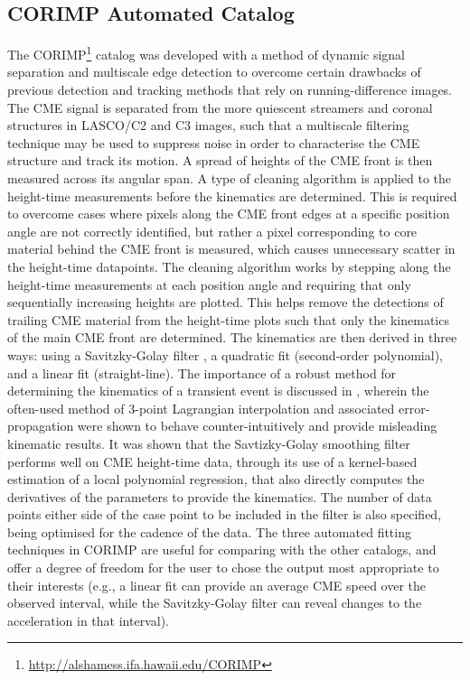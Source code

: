 \documentclass[referee,a4paper,12pt,traditabstract]{swsc}
\begin{document}
\begin{linenumbers}
\subsection{CORIMP Automated Catalog}
\label{sect_corimp}

The CORIMP\footnote{\href{http://alshamess.ifa.hawaii.edu/CORIMP/}{http://alshamess.ifa.hawaii.edu/CORIMP}} catalog was developed with a method of dynamic signal separation and multiscale edge detection to overcome certain drawbacks of previous detection and tracking methods that rely on running-difference images. The CME signal is separated from the more quiescent streamers and coronal structures in LASCO/C2 and C3 images, such that a multiscale filtering technique may be used to suppress noise in order to characterise the CME structure and track its motion. A spread of heights of the CME front is then measured across its angular span. A type of cleaning algorithm is applied to the height-time measurements before the kinematics are determined. This is required to overcome cases where pixels along the CME front edges at a specific position angle are not correctly identified, but rather a pixel corresponding to core material behind the CME front is measured, which causes unnecessary scatter in the height-time datapoints. The cleaning algorithm works by stepping along the height-time measurements at each position angle and requiring that only sequentially increasing heights are plotted. This helps remove the detections of trailing CME material from the height-time plots such that only the kinematics of the main CME front are determined. The kinematics are then derived in three ways: using a Savitzky-Golay filter \citep{Savitzky-Golay1964}, a quadratic fit (second-order polynomial), and a linear fit (straight-line). The importance of a robust method for determining the kinematics of a transient event is discussed in \cite{2013A&A...557A..96B}, wherein the often-used method of 3-point Lagrangian interpolation and associated error-propagation were shown to behave counter-intuitively and provide misleading kinematic results. It was shown that the Savtizky-Golay smoothing filter performs well on CME height-time data, through its use of a kernel-based estimation of a local polynomial regression, that also directly computes the derivatives of the parameters to provide the kinematics. The number of data points either side of the case point to be included in the filter is also specified, being optimised for the cadence of the data. The three automated fitting techniques in CORIMP are useful for comparing with the other catalogs, and offer a degree of freedom for the user to chose the output most appropriate to their interests (e.g., a linear fit can provide an average CME speed over the observed interval, while the Savitzky-Golay filter can reveal changes to the acceleration in that interval).



\end{linenumbers}
\end{document}
